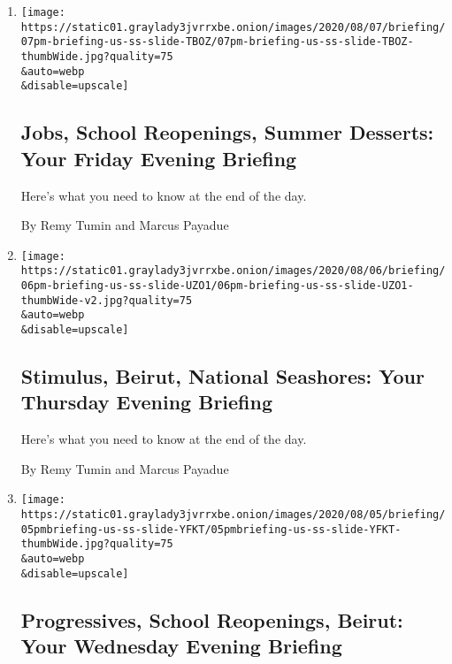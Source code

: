 \begin{enumerate}
\def\labelenumi{\arabic{enumi}.}
\item
  \href{/2020/08/07/briefing/jobs-school-reopenings-summer-desserts.html}{}

  \texttt{[image: https://static01.graylady3jvrrxbe.onion/images/2020/08/07/briefing/07pm-briefing-us-ss-slide-TBOZ/07pm-briefing-us-ss-slide-TBOZ-thumbWide.jpg?quality=75\\\&auto=webp\\\&disable=upscale]}

  \hypertarget{jobs-school-reopenings-summer-desserts-your-friday-evening-briefing}{%
  \subsection{Jobs, School Reopenings, Summer Desserts: Your Friday
  Evening
  Briefing}\label{jobs-school-reopenings-summer-desserts-your-friday-evening-briefing}}

  Here's what you need to know at the end of the day.

  By Remy Tumin and Marcus Payadue
\item
  \href{/2020/08/06/briefing/stimulus-beirut-national-seashores.html}{}

  \texttt{[image: https://static01.graylady3jvrrxbe.onion/images/2020/08/06/briefing/06pm-briefing-us-ss-slide-UZO1/06pm-briefing-us-ss-slide-UZO1-thumbWide-v2.jpg?quality=75\\\&auto=webp\\\&disable=upscale]}

  \hypertarget{stimulus-beirut-national-seashores-your-thursday-evening-briefing}{%
  \subsection{Stimulus, Beirut, National Seashores: Your Thursday
  Evening
  Briefing}\label{stimulus-beirut-national-seashores-your-thursday-evening-briefing}}

  Here's what you need to know at the end of the day.

  By Remy Tumin and Marcus Payadue
\item
  \href{/2020/08/05/briefing/progressives-school-reopenings-beirut.html}{}

  \texttt{[image: https://static01.graylady3jvrrxbe.onion/images/2020/08/05/briefing/05pmbriefing-us-ss-slide-YFKT/05pmbriefing-us-ss-slide-YFKT-thumbWide.jpg?quality=75\\\&auto=webp\\\&disable=upscale]}

  \hypertarget{progressives-school-reopenings-beirut-your-wednesday-evening-briefing}{%
  \subsection{Progressives, School Reopenings, Beirut: Your Wednesday
  Evening
  Briefing}\label{progressives-school-reopenings-beirut-your-wednesday-evening-briefing}}


\end{enumerate}
